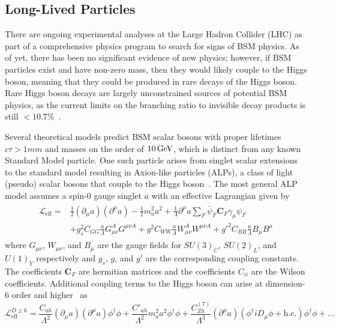 \subsection{Long-Lived Particles} \label{sec:LLPs}
There are ongoing experimental analyses at the Large Hadron Collider (LHC) as part of a comprehensive physics program to search for signs of BSM physics. As of yet, there has been no significant evidence of new physics; however, if BSM particles exist and have non-zero mass, then they would likely couple to the Higgs boson, meaning that they could be produced in rare decays of the Higgs boson. Rare Higgs boson decays are largely unconstrained sources of potential BSM physics, as the current limits on the branching ratio to invisible decay products is still $<10.7\%$~\cite{pdg2024}.

Several theoretical models predict BSM scalar bosons with proper lifetimes $c\tau>1\unit{mm}$ and masses on the order of $10\,\text{Ge\hspace{-.08em}V}$, which is distinct from any known Standard Model particle. One such particle arises from singlet scalar extensions to the standard model resulting in Axion-like particles (ALPs), a class of light (pseudo) scalar bosons that couple to the Higgs boson~\cite{atlas_alp}. The most general ALP model assumes a spin-0 gauge singlet $a$ with an effective Lagrangian given by~\cite{alp_colliders}
\begin{align}
	\label{eq:alp_lagrangian}
	\begin{split}
		\mathcal{L}_\text{eff}=&\frac{1}{2}\left(\partial_\mu a\right)\left(\partial^\mu a\right)-\frac{1}{2}m_a^2a^2+\frac{1}{\Lambda}\partial^\mu a\sum_{F}\bar{\psi}_F\mathbf{C}_F\gamma_\mu\psi_F\\
		&+g_s^2C_{GG}\frac{a}{\Lambda}G_{\mu\nu}^AG^{\mu\nu A}+g^2C_{WW}\frac{a}{\Lambda}W_{\mu\nu}^AW^{\mu\nu A}+g'^2C_{BB}\frac{a}{\Lambda}B_\mu B^\mu
	\end{split}
\end{align}
where $G_{\mu\nu}$, $W_{\mu\nu}$, and $B_\mu$ are the gauge fields for $SU(3)_C$, $SU(2)_L$, and $U(1)_Y$ respectively and $g_s$, $g$, and $g'$ are the corresponding coupling constants. The coefficients $\mathbf{C}_F$ are hermitian matrices and the coefficients $C_{ii}$ are the Wilson coefficients. Additional coupling terms to the Higgs boson can arise at dimension-6 order and higher~\cite{alp_colliders} as
\begin{equation}
	\label{eq:alp_6d_lagrangian}
	\mathcal{L}_\text{eff}^{D\geq6}=\frac{C_{ah}}{\Lambda^2}(\partial_\mu a)(\partial^\mu a)\phi^\dagger\phi+\frac{C'_{ah}}{\Lambda^2}m_a^2a^2\phi^\dagger\phi+\frac{C_{Zh}^{(7)}}{\Lambda^3}(\partial^\mu a)(\phi^\dagger iD_\mu\phi+\text{h.c.})\phi^\dagger\phi+...
\end{equation}
